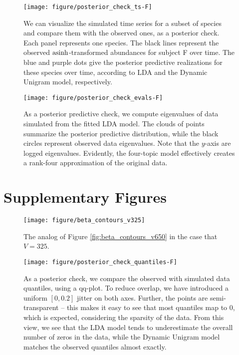 \documentclass[oupdraft]{bio}
\begin{document}
\begin{figure}[!p]
  \centering
  \texttt{[image: figure/posterior\_check\_ts-F]}
  \caption{We can visualize the simulated time series for a subset of species
    and compare them with the observed ones, as a posterior check. Each panel
    represents one species. The black lines represent the observed
    $\mathop\mathrm{asinh}$-transformed abundances for subject F over time. The blue and purple
    dots give the posterior predictive realizations for these species over time,
    according to LDA and the Dynamic Unigram model, respectively.
    \label{fig:antibiotics_posterior_ts}}
\end{figure}

\begin{figure}[!p]
  \centering
  \texttt{[image: figure/posterior\_check\_evals-F]}
  \caption{As a posterior predictive check, we compute eigenvalues of data
    simulated from the fitted LDA model. The clouds of points summarize the
    posterior predictive distribution, while the black circles represent
    observed data eigenvalues. Note that the $y$-axis are logged eigenvalues.
    Evidently, the four-topic model effectively creates a rank-four
    approximation of the original data. \label{fig:antibiotics_posterior_evals}}
\end{figure}

\section{Supplementary Figures}

\begin{figure}[!p]
  \centering
  \texttt{[image: figure/beta\_contours\_v325]}
  \caption{The analog of Figure \ref{fig:beta_contours_v650} in the case that $V
    = 325$. \label{fig:beta_contours_v325}}
\end{figure}

\begin{figure}[!p]
  \centering
  \texttt{[image: figure/posterior\_check\_quantiles-F]}
  \caption{As a posterior check, we compare the observed with simulated
    data quantiles, using a qq-plot. To reduce overlap, we have introduced a
    uniform $\left[0, 0.2\right]$ jitter on both axes. Further, the points are
    semi-transparent -- this makes it easy to see that most quantiles map to 0,
    which is expected, considering the sparsity of the data. From this view, we
    see that the LDA model tends to underestimate the overall number of zeros in
    the data, while the Dynamic Unigram model matches the observed quantiles
    almost exactly. \label{fig:antibiotics_posterior_quantiles} }
\end{figure}
\end{document}

